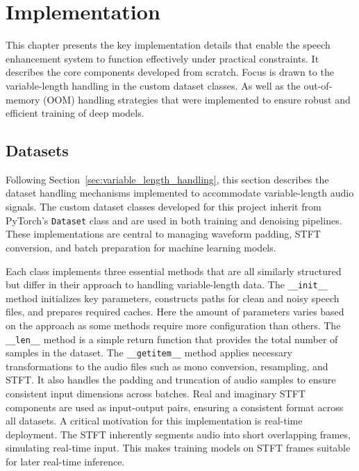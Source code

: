 \graphicspath{{content/chapters/6_implementation/figures/}}
\chapter{Implementation}
\label{chp:implementation}

This chapter presents the key implementation details that enable the speech enhancement system to function effectively under practical constraints. It describes the core components developed from scratch. Focus is drawn to the variable-length handling in the custom dataset classes. As well as the out-of-memory (OOM) handling strategies that were implemented to ensure robust and efficient training of deep models. 

\section{Datasets}
\label{sec:datasets}

Following Section~\ref{sec:variable_length_handling}, this section describes the dataset handling mechanisms implemented to accommodate variable-length audio signals. The custom dataset classes developed for this project inherit from PyTorch’s \texttt{Dataset} class and are used in both training and denoising pipelines. These implementations are central to managing waveform padding, STFT conversion, and batch preparation for machine learning models.

Each class implements three essential methods that are all similarly structured but differ in their approach to handling variable-length data. The \texttt{\_\_init\_\_} method initializes key parameters, constructs paths for clean and noisy speech files, and prepares required caches. Here the amount of parameters varies based on the approach as some methods require more configuration than others. The \texttt{\_\_len\_\_} method is a simple return function that provides the total number of samples in the dataset. The \texttt{\_\_getitem\_\_} method applies necessary transformations to the audio files such as mono conversion, resampling, and STFT. It also handles the padding and truncation of audio samples to ensure consistent input dimensions across batches. Real and imaginary STFT components are used as input-output pairs, ensuring a consistent format across all datasets. A critical motivation for this implementation is real-time deployment. The STFT inherently segments audio into short overlapping frames, simulating real-time input. This makes training models on STFT frames suitable for later real-time inference.

